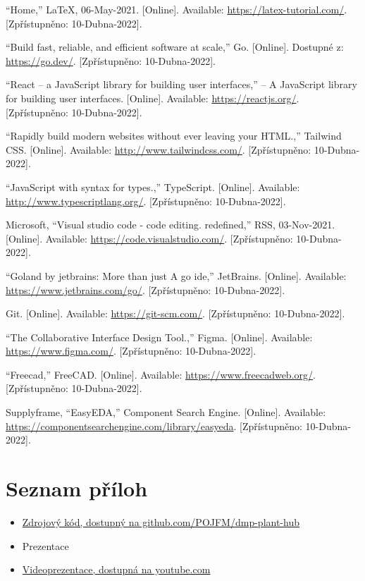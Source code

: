 \documentclass[12pt,a4paper]{article}
\begin{document}
\begin{thebibliography}{9}
	\vspace*{-1.5cm}
	“Home,” LaTeX, 06-May-2021. [Online]. Available: \href{https://latex-tutorial.com/}{https://latex-tutorial.com/}. [Zpřístupněno: 10-Dubna-2022]. 

	“Build fast, reliable, and efficient software at scale,” Go. [Online]. Dostupné z: \href{https://go.dev/}{https://go.dev/}. [Zpřístupněno: 10-Dubna-2022]. 

	“React – a JavaScript library for building user interfaces,” – A JavaScript library for building user interfaces. [Online]. Available: \href{https://reactjs.org/}{https://reactjs.org/}. [Zpřístupněno: 10-Dubna-2022]. 

	“Rapidly build modern websites without ever leaving your HTML.,” Tailwind CSS. [Online]. Available: \href{http://www.tailwindcss.com/}{http://www.tailwindcss.com/}. [Zpřístupněno: 10-Dubna-2022]. 

	“JavaScript with syntax for types.,” TypeScript. [Online]. Available: \href{http://www.typescriptlang.org/}{http://www.typescriptlang.org/}. [Zpřístupněno: 10-Dubna-2022]. 

	Microsoft, “Visual studio code - code editing. redefined,” RSS, 03-Nov-2021. [Online]. Available: \href{https://code.visualstudio.com/}{https://code.visualstudio.com/}. [Zpřístupněno: 10-Dubna-2022]. 

	“Goland by jetbrains: More than just A go ide,” JetBrains. [Online]. Available: \href{https://www.jetbrains.com/go/}{https://www.jetbrains.com/go/}. [Zpřístupněno: 10-Dubna-2022]. 

	Git. [Online]. Available: \href{https://git-scm.com/}{https://git-scm.com/}. [Zpřístupněno: 10-Dubna-2022]. 

	“The Collaborative Interface Design Tool.,” Figma. [Online]. Available: \href{https://www.figma.com/}{https://www.figma.com/}. [Zpřístupněno: 10-Dubna-2022]. 

	“Freecad,” FreeCAD. [Online]. Available: \href{https://www.freecadweb.org/}{https://www.freecadweb.org/}. [Zpřístupněno: 10-Dubna-2022]. 

	Supplyframe, “EasyEDA,” Component Search Engine. [Online]. Available: \href{https://componentsearchengine.com/library/easyeda}{https://componentsearchengine.com/library/easyeda}. [Zpřístupněno: 10-Dubna-2022]. 
\end{thebibliography}

\section{Seznam příloh}

\begin{itemize}
	\item \href{https://github.com/POJFM/dmp-plant-hub}{Zdrojový kód, dostupný na github.com/POJFM/dmp-plant-hub}
	\item Prezentace
	\item \href{https://www.youtube.com/watch?v=oo2_pDX5OE4}{Videoprezentace, dostupná na youtube.com}
\end{itemize}
\end{document}
